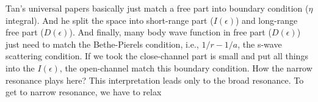 Tan's universal papers\cite{Tan2008-1,Tan2008-2} basically just match a free part into boundary condition ($\eta$ integral).  And he split the space into short-range part ($I(\epsilon)$) and long-range free part ($D(\epsilon)$).  And finally, many body wave function in free part ($D(\epsilon)$) just need to match the Bethe-Pierels condition, i.e., $1/r-1/a$, the s-wave scattering condition.  If we took the close-channel part is small and put all things into the $I(\epsilon)$, the open-channel match this boundary condition.  How the narrow resonance plays here? This interpretation leads only to the broad resonance. To get to narrow resonance, we have to relax 
